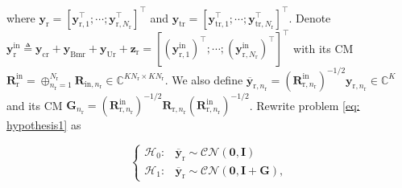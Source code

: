 \documentclass[10pt,journal]{IEEEtran}
\newcommand{\paren}[1]{\left({#1}\right)}
\newcommand{\bracket}[1]{{\left [{#1}\right ]}}
\newcommand{\rr}{_\mathrm{r}}
\newcommand{\sfrac}[2]{#1/#2}
\theoremstyle{definition}
\begin{document}
where $\mathbf{y}_{\mathrm{r}}=\bracket{\mathbf{y}^\top_{\textrm{r},1};\cdots;\mathbf{y}^\top_{\textrm{r},\mathit{N}\rr}}^\top$ and $\mathbf{y}_{\textrm{tr}}=\bracket{\mathbf{y}^\top_{\textrm{tr},1};\cdots;\mathbf{y}^\top_{\textrm{tr},\mathit{N}\rr}}^\top$. Denote $\mathbf{y}^{\textrm{in}}_{\textrm{r}}\triangleq\mathbf{y}_{\textrm{cr}}+\mathbf{y}_{\textrm{Bmr}}+\mathbf{y}_{\textrm{Ur}}+\mathbf{z}_{\textrm{r}}=\bracket{\paren{\mathbf{y}^{\textrm{in}}_{\textrm{r},1}}^\top;\cdots;\paren{\mathbf{y}^{\textrm{in}}_{\textrm{r},N\rr}}^\top}^\top$ with its CM $\mathbf{R}^{\textrm{in}}_{\textrm{r}}=\oplus_{n\rr=1}^{N\rr}\mathbf{R}_{\textrm{in},n\rr}\in\mathbb{C}^{KN\rr\times KN\rr}$. We also define $\overline{\mathbf{y}}_{\textrm{r},n\rr} = \paren{\mathbf{R}^{\textrm{in}}_{\textrm{r},n\rr}}^{-\sfrac{1}{2}}\mathbf{y}_{\textrm{r},n\rr}\in\mathbb{C}^{K}$ and its CM $\mathbf{G}_{n\rr}=\paren{\mathbf{R}^{\textrm{in}}_{\textrm{r},n\rr}}^{-\sfrac{1}{2}}\mathbf{R}_{\textrm{r},n\rr}\paren{\mathbf{R}^{\textrm{in}}_{\textrm{r},n\rr}}^{-\sfrac{1}{2}}$. Rewrite problem \eqref{eq: hypothesis1} as  \par\noindent\small
\begin{equation}
	\label{eq: hypothesis2}
\begin{cases}
\mathcal{H}_{\mathrm{0}}: & \overline{\mathbf{y}}_{\mathrm{r}}\sim\mathcal{CN}\paren{\mathbf{0},\mathbf{I}}
\\
\mathcal{H}_{\mathrm{1}}: & \overline{\mathbf{y}}_{\mathrm{r}}\sim\mathcal{CN}\paren{\mathbf{0},\mathbf{I}+\mathbf{G}},
\end{cases}
\end{equation}\normalsize
\end{document}
